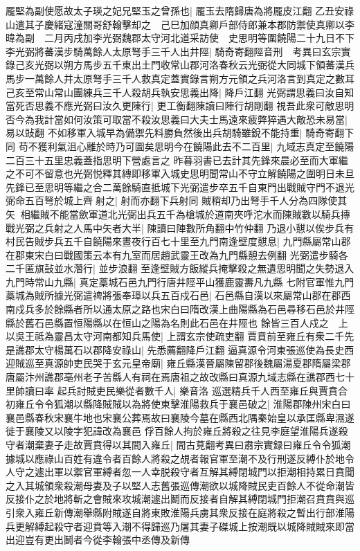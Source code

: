 龎堅為副使愿故太子瑛之妃兄堅玉之曾孫也|{
	龎玉去隋歸唐為將龎皮江翻}
乙丑安祿山遣其子慶緒寇潼關哥舒翰擊却之　己巳加顔真卿戶部侍郎兼本郡防禦使真卿以李暐為副　二月丙戌加李光弼魏郡太守河北道采訪使　史思明等圍饒陽二十九日不下李光弼將蕃漢步騎萬餘人太原弩手三千人出井陘|{
	騎奇寄翻陘音刑　考異曰玄宗實錄己亥光弼以朔方馬步五千東出土門收常山郡河洛春秋云光弼從大同城下領蕃漢兵馬步一萬餘人并太原弩手三千人救真定蓋實錄言朔方元領之兵河洛言到真定之數耳}
己亥至常山常山團練兵三千人殺胡兵執安思義出降|{
	降戶江翻}
光弼謂思義曰汝自知當死否思義不應光弼曰汝久更陳行|{
	更工衡翻陳讀曰陣行胡剛翻}
視吾此衆可敵思明否今為我計當如何汝策可取當不殺汝思義曰大夫士馬遠來疲弊猝遇大敵恐未易當|{
	易以䜴翻}
不如移軍入城早為備禦先料勝負然後出兵胡騎雖銳不能持重|{
	騎奇寄翻下同}
苟不獲利氣沮心離於時乃可圖矣思明今在饒陽此去不二百里|{
	九域志真定至饒陽二百三十五里忠義蓋指思明下營處言之}
昨暮羽書已去計其先鋒來晨必至而大軍繼之不可不留意也光弼悦釋其縳即移軍入城史思明聞常山不守立解饒陽之圍明日未旦先鋒已至思明等繼之合二萬餘騎直抵城下光弼遣步卒五千自東門出戰賊守門不退光弼命五百弩於城上齊射之|{
	射而亦翻下兵射同}
賊稍却乃出弩手千人分為四隊使其矢相繼賊不能當歛軍道北光弼出兵五千為槍城於道南夾呼沱水而陳賊數以騎兵摶戰光弼之兵射之人馬中矢者大半|{
	陳讀曰陣數所角翻中竹仲翻}
乃退小憇以俟步兵有村民告賊步兵五千自饒陽來晝夜行百七十里至九門南逢壁度憇息|{
	九門縣屬常山郡在郡東宋白曰戰國策云本有九室而居趙武靈王改為九門縣憩去例翻}
光弼遣步騎各二千匿旗鼔並水濳行|{
	並步浪翻}
至逢壁賊方飯縱兵掩擊殺之無遺思明聞之失勢退入九門時常山九縣|{
	真定藁城石邑九門行唐井陘平山獲鹿靈夀凡九縣}
七附官軍惟九門藁城為賊所據光弼遣禆將張奉璋以兵五百戍石邑|{
	石邑縣自漢以來屬常山郡在郡西南戍兵多於餘縣者所以通太原之路也宋白曰隋改漢上曲陽縣為石邑尋移石邑於井陘縣於舊石邑縣置恒陽縣以在恒山之陽為名則此石邑在井陘也}
餘皆三百人戍之　上以吳王祗為靈昌太守河南都知兵馬使|{
	上謂玄宗使疏吏翻}
賈賁前至雍丘有衆二千先是譙郡太守楊萬石以郡降安祿山|{
	先悉薦翻降戶江翻}
逼真源令河東張巡使為長史西迎賊巡至真源帥吏民哭于玄元皇帝廟|{
	雍丘縣漢晉屬陳留郡後魏屬湯夏郡隋屬梁郡唐屬汴州譙郡亳州老子苦縣人有祠在焉唐祖之故改縣曰真源九域志縣在譙郡西七十里帥讀曰率}
起兵討賊吏民樂從者數千人|{
	樂音洛}
巡選精兵千人西至雍丘與賈賁合初雍丘令令狐潮以縣降賊賊以為將使東擊淮陽救兵于襄邑破之|{
	淮陽郡陳州宋白曰襄邑縣春秋宋襄牛地也宋襄公葬焉故曰襄陵今墓在縣西北隅秦始皇以承匡縣卑濕遂徙于襄陵又以陵字犯諱改為襄邑}
俘百餘人拘於雍丘將殺之往見李庭望淮陽兵遂殺守者潮棄妻子走故賈賁得以其間入雍丘|{
	間古莧翻考異曰肅宗實録曰雍丘令令狐潮據城以應祿山百姓有違令者百餘人將殺之覘者報官軍至潮不及行刑遂反縛仆於地令人守之遽出軍以禦官軍縛者忽一人幸脱殺守者互解其縛閉城門以拒潮相持累日賁聞之入其城領衆殺潮母妻及子以堅人志舊張巡傳潮欲以城降賊民吏百餘人不從命潮皆反接仆之於地將斬之會賊來攻城潮遽出鬭而反接者自解其縛閉城門拒潮召賁賁與巡引衆入雍丘新傳潮舉縣附賊遂自將東敗淮陽兵虜其衆反接在庭將殺之暫出行部淮陽兵更解縛起殺守者迎賁等入潮不得歸巡乃屠其妻子磔城上按潮既以城降賊賊來即當出迎豈有更出鬭者今從李翰張中丞傳及新傳}
